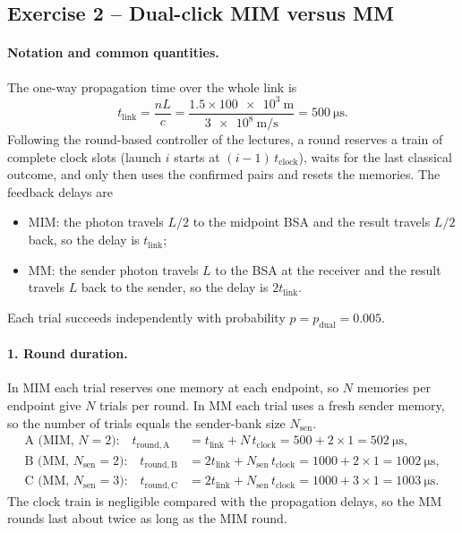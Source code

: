 
\subsection{Exercise 2 -- Dual-click MIM versus MM}
\label{sec:q2}

\paragraph{Notation and common quantities.}
The one-way propagation time over the whole link is
\begin{equation}
  t_\mathrm{link} = \frac{nL}{c} = \frac{1.5\times\SI{100e3}{\metre}}{\SI{3e8}{\metre\per\second}} = \SI{500}{\micro\second}.
\end{equation}
Following the round-based controller of the lectures, a round reserves a train of complete clock slots
(launch $i$ starts at $(i-1)\,t_\mathrm{clock}$), waits for the last classical outcome, and only then
uses the confirmed pairs and resets the memories. The feedback delays are
\begin{itemize}
  \item MIM: the photon travels $L/2$ to the midpoint BSA and the result travels $L/2$ back, so the delay is $t_\mathrm{link}$;
  \item MM: the sender photon travels $L$ to the BSA at the receiver and the result travels $L$ back to the sender, so the delay is $2t_\mathrm{link}$.
\end{itemize}
Each trial succeeds independently with probability $p = p_\mathrm{dual} = 0.005$.

\paragraph{1. Round duration.}
In MIM each trial reserves one memory at each endpoint, so $N$ memories per endpoint give $N$ trials per round.
In MM each trial uses a fresh sender memory, so the number of trials equals the sender-bank size $N_\mathrm{sen}$.
\begin{align}
  \text{A (MIM, } N=2\text{):}\quad
  t_\mathrm{round,A} &= t_\mathrm{link} + N\,t_\mathrm{clock} = 500 + 2\times1 = \SI{502}{\micro\second},\\
  \text{B (MM, } N_\mathrm{sen}=2\text{):}\quad
  t_\mathrm{round,B} &= 2t_\mathrm{link} + N_\mathrm{sen}\,t_\mathrm{clock} = 1000 + 2\times1 = \SI{1002}{\micro\second},\\
  \text{C (MM, } N_\mathrm{sen}=3\text{):}\quad
  t_\mathrm{round,C} &= 2t_\mathrm{link} + N_\mathrm{sen}\,t_\mathrm{clock} = 1000 + 3\times1 = \SI{1003}{\micro\second}.
\end{align}
The clock train is negligible compared with the propagation delays, so the MM rounds last about twice as long
as the MIM round.

